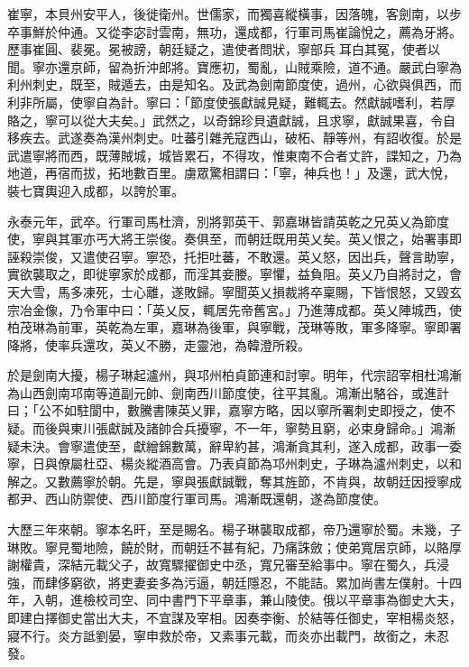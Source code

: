\begin{pinyinscope}
 崔寧，本貝州安平人，後徙衛州。世儒家，而獨喜縱橫事，因落魄，客劍南，以步卒事鮮於仲通。又從李宓討雲南，無功，還成都，行軍司馬崔論悅之，薦為牙將。歷事崔圓、裴冕。冕被謗，朝廷疑之，遣使者問狀，寧部兵耳白其冤，使者以聞。寧亦還京師，留為折沖郎將。寶應初，蜀亂，山賊乘險，道不通。嚴武白寧為利州刺史，既至，賊遁去，由是知名。及武為劍南節度使，過州，心欲與俱西，而利非所屬，使寧自為計。寧曰：「節度使張獻誠見疑，難輒去。然獻誠嗜利，若厚賂之，寧可以從大夫矣。」武然之，以奇錦珍貝遺獻誠，且求寧，獻誠果喜，令自移疾去。武遂奏為漢州刺史。吐蕃引雜羌寇西山，破柘、靜等州，有詔收復。於是武遣寧將而西，既薄賊城，城皆累石，不得攻，惟東南不合者丈許，諜知之，乃為地道，再宿而拔，拓地數百里。虜眾驚相謂曰：「寧，神兵也！」及還，武大悅，裝七寶輿迎入成都，以誇於軍。



 永泰元年，武卒。行軍司馬杜濟，別將郭英干、郭嘉琳皆請英乾之兄英乂為節度使，寧與其軍亦丐大將王崇俊。奏俱至，而朝廷既用英乂矣。英乂恨之，始署事即誣殺崇俊，又遣使召寧。寧恐，托拒吐蕃，不敢還。英乂怒，因出兵，聲言助寧，實欲襲取之，即徙寧家於成都，而淫其妾媵。寧懼，益負阻。英乂乃自將討之，會天大雪，馬多凍死，士心離，遂敗歸。寧聞英乂損裁將卒稟賜，下皆恨怒，又毀玄宗冶金像，乃令軍中曰：「英乂反，輒居先帝舊宮。」乃進薄成都。英乂陣城西，使柏茂琳為前軍，英乾為左軍，嘉琳為後軍，與寧戰，茂琳等敗，軍多降寧。寧即署降將，使率兵還攻，英乂不勝，走靈池，為韓澄所殺。



 於是劍南大擾，楊子琳起瀘州，與邛州柏貞節連和討寧。明年，代宗詔宰相杜鴻漸為山西劍南邛南等道副元帥、劍南西川節度使，往平其亂。鴻漸出駱谷，或進計曰；「公不如駐閬中，數騰書陳英乂罪，嘉寧方略，因以寧所署刺史即授之，使不疑。而後與東川張獻誠及諸帥合兵擾寧，不一年，寧勢且窮，必束身歸命。」鴻漸疑未決。會寧遣使至，獻繒錦數萬，辭卑約甚，鴻漸貪其利，遂入成都，政事一委寧，日與僚屬杜亞、楊炎縱酒高會。乃表貞節為邛州刺史，子琳為瀘州刺史，以和解之。又數薦寧於朝。先是，寧與張獻誠戰，奪其旌節，不肯與，故朝廷因授寧成都尹、西山防禦使、西川節度行軍司馬。鴻漸既還朝，遂為節度使。



 大歷三年來朝。寧本名旰，至是賜名。楊子琳襲取成都，帝乃還寧於蜀。未幾，子琳敗。寧見蜀地險，饒於財，而朝廷不甚有紀，乃痛誅斂；使弟寬居京師，以賂厚謝權貴，深結元載父子，故寬驟擢御史中丞，寬兄審至給事中。寧在蜀久，兵浸強，而肆侈窮欲，將吏妻妾多為污逼，朝廷隱忍，不能詰。累加尚書左僕射。十四年，入朝，進檢校司空、同中書門下平章事，兼山陵使。俄以平章事為御史大夫，即建白擇御史當出大夫，不宜謀及宰相。因奏李衡、於結等任御史，宰相楊炎怒，寢不行。炎方詆劉晏，寧申救於帝，又素事元載，而炎亦出載門，故銜之，未忍發。




\end{pinyinscope}
